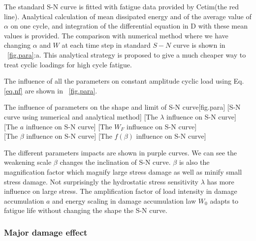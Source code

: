 \documentclass[3p,times,number,review]{elsarticle}
\newcommand{\figref}[1]{\figurename~\ref{#1}}
\begin{document}
The standard S-N curve is fitted with fatigue data provided by Cetim(the red line). Analytical calculation of mean dissipated energy and of the average value of $\alpha$ on one cycle, and  integration of the differential equation in D with these mean values is provided. The comparison with numerical method where we have changing $\alpha$ and $W$ at each time step in standard $S-N$ curve is shown in \figref{fig.para}:a. This analytical strategy is proposed to give a much cheaper way to treat cyclic loadings for high cycle fatigue. 

 

The influence of all the parameters on constant amplitude cyclic load using Eq.\eqref{eq.nf}  are shown in \figref{fig.para}.
\begin{Figure}[!h]{The influence of parameters on the shape and limit of S-N curve}[fig.para]
	[S-N curve using numerical and analytical method]
	[The $\lambda$ influence on S-N curve]
	\\
    [The $a$ influence on S-N curve]
	[The $W_F$ influence on S-N curve]
	\\
	[The $\beta$ influence on S-N curve]
	[The $f(\beta)$ influence on S-N curve]
\end{Figure}


 The different parameters impacts are shown in purple curves. We can see the weakening scale $\beta$ changes the inclination of S-N curve. $\beta$ is also the magnification factor which magnify large stress damage as well as minify small stress damage.  Not surprisingly the hydrostatic stress sensitivity $\lambda$ has more influence on large stress. The amplification factor of load intensity in damage accumulation $a$ and  energy scaling in damage accumulation law $W_0$ adapts to fatigue life without changing the shape the S-N curve.


\newpage
\subsubsection{Major damage effect}
\end{document}
